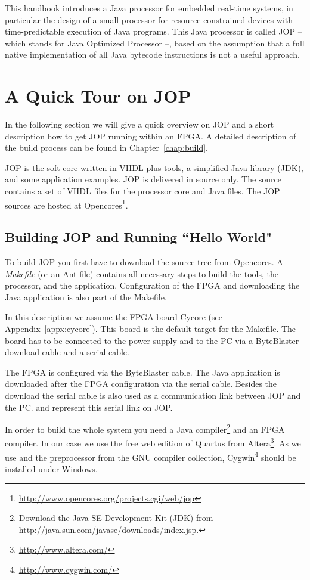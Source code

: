 

This handbook introduces a Java processor for embedded real-time
systems, in particular the design of a small processor for
resource-constrained devices with time-predictable execution of Java
programs. This Java processor is called JOP -- which stands for Java
Optimized Processor --, based on the assumption that a full native
implementation of all Java bytecode instructions is not a useful
approach.

\section{A Quick Tour on JOP}

In the following section we will give a quick overview on JOP and a
short description how to get JOP running within an FPGA. A detailed
description of the build process can be found in
Chapter~\ref{chap:build}.

JOP is the soft-core written in VHDL plus tools, a simplified Java
library (JDK), and some application examples. JOP is delivered in
source only. The source contains a set of VHDL files for the
processor core and Java files. The JOP sources are hosted at
Opencores\footnote{\url{http://www.opencores.org/projects.cgi/web/jop}}.


\subsection{Building JOP and Running ``Hello World"}

To build JOP you first have to download the source tree from
Opencores. A \emph{Makefile} (or an Ant file) contains all necessary
steps to build the tools, the processor, and the application.
Configuration of the FPGA and downloading the Java application is
also part of the Makefile.

In this description we assume the FPGA board Cycore (see
Appendix~\ref{appx:cycore}). This board is the default target for
the Makefile. The board has to be connected to the power supply and
to the PC via a ByteBlaster download cable and a serial cable.

The FPGA is configured via the ByteBlaster cable. The Java
application is downloaded after the FPGA configuration via the serial
cable. Besides the download the serial cable is also used as a
communication link between JOP and the PC.  and
 represent this serial link on JOP.

In order to build the whole system you need a Java
compiler\footnote{Download the Java SE Development Kit (JDK) from
\url{http://java.sun.com/javase/downloads/index.jsp}.} and an FPGA
compiler. In our case we use the free web edition of Quartus from
Altera\footnote{\url{http://www.altera.com/}}. As we use 
and the preprocessor from the GNU compiler collection,
Cygwin\footnote{\url{http://www.cygwin.com/}} should be installed
under Windows.


